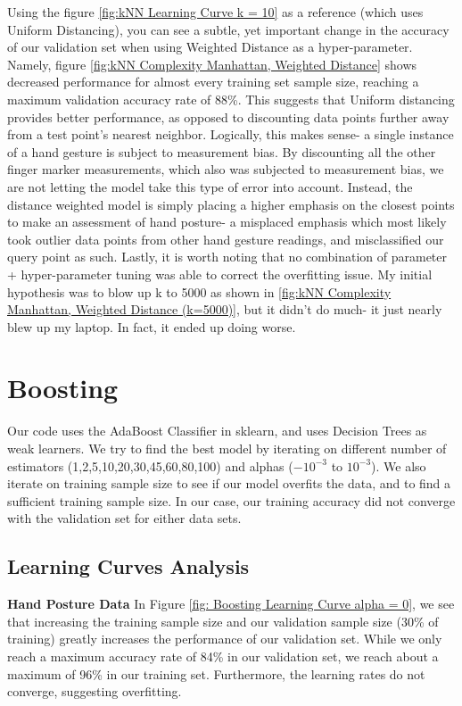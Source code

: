 \documentclass[letterpaper,12pt]{article}
\begin{document}
Using the figure \ref{fig:kNN Learning Curve k = 10} as a reference (which uses Uniform Distancing), you can see a subtle, yet important change in the accuracy of our validation set when using Weighted Distance as a hyper-parameter.  Namely, figure \ref{fig:kNN Complexity Manhattan, Weighted Distance} shows decreased performance for almost every training set sample size, reaching a maximum validation accuracy rate of 88\%.  This suggests that Uniform distancing provides better performance, as opposed to discounting data points further away from a test point's nearest neighbor.  Logically, this makes sense- a single instance of a hand gesture is subject to measurement bias.  By discounting all the other finger marker measurements, which also was subjected to measurement bias, we are not letting the model take this type of error into account.  Instead, the distance weighted model is simply placing a higher emphasis on the closest points to make an assessment of hand posture- a misplaced emphasis which most likely took outlier data points from other hand gesture readings, and misclassified our query point as such.  Lastly, it is worth noting that no combination of parameter + hyper-parameter tuning was able to correct the overfitting issue.  My initial hypothesis was to blow up k to 5000 as shown in \ref{fig:kNN Complexity Manhattan, Weighted Distance (k=5000)}, but it didn't do much- it just nearly blew up my laptop.  In fact, it ended up doing worse.

\section{Boosting}
Our code uses the AdaBoost Classifier in sklearn, and uses Decision Trees as weak learners.  We try to find the best model by iterating on different number of estimators (1,2,5,10,20,30,45,60,80,100) and alphas ($-10^{-3}$ to $10^{-3}$). We also iterate on training sample size to see if our model overfits the data, and to find a sufficient training sample size.  In our case, our training accuracy did not converge with the validation set for either data sets.   
\subsection{Learning Curves Analysis}

\textbf{Hand Posture Data}
In Figure \ref{fig: Boosting Learning Curve alpha = 0}, we see that increasing the training sample size and our validation sample size (30\% of training) greatly increases the performance of our validation set.  While we only reach a maximum accuracy rate of 84\% in our validation set, we reach about a maximum of 96\% in our training set.  Furthermore, the learning rates do not converge, suggesting overfitting.
\end{document}

